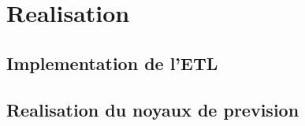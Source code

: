 \chapter{Realisation}
	\section{Implementation de l'ETL}
	\section{Realisation du noyaux de prevision}